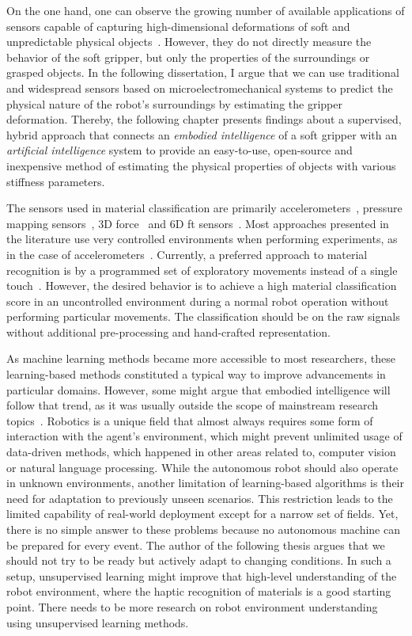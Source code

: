 \documentclass[a4paper, 10pt, twoside]{report}
\begin{document}
On the one hand, one can observe the growing number of available applications of sensors capable of capturing high-dimensional deformations of soft and unpredictable physical objects~\cite{BatchFabricationSensor, TactileTwo, Realmuto}. However, they do not directly measure the behavior of the soft gripper, but only the properties of the surroundings or grasped objects. In the following dissertation, I argue that we can use traditional and widespread sensors based on microelectromechanical systems to predict the physical nature of the robot's surroundings by estimating the gripper deformation. Thereby, the following chapter presents findings about a supervised, hybrid approach that connects an \textit{embodied intelligence} of a soft gripper with an \textit{artificial intelligence} system to provide an easy-to-use, open-source and inexpensive method of estimating the physical properties of objects with various stiffness parameters. 

The sensors used in material classification are primarily accelerometers~\cite{Strese2014AClassification}, pressure mapping sensors~\cite{Tulbure2018}, 3D force~\cite{Kerzel2017} and 6D \acrshort{ft} sensors~\cite{KubaRNN}. Most approaches presented in the literature use very controlled environments when performing experiments, as in the case of accelerometers~\cite{Strese2014AClassification}. Currently, a preferred approach to material recognition is by a programmed set of exploratory movements instead of a single touch~\cite{Kerzel2017, Tulbure2018}. However, the desired behavior is to achieve a high material classification score in an uncontrolled environment during a normal robot operation without performing particular movements. The classification should be on the raw signals without additional pre-processing and hand-crafted representation. 

As machine learning methods became more accessible to most researchers, these learning-based methods constituted a typical way to improve advancements in particular domains. However, some might argue that embodied intelligence will follow that trend, as it was usually outside the scope of mainstream research topics~\cite{Roy2021}. Robotics is a unique field that almost always requires some form of interaction with the agent's environment, which might prevent unlimited usage of data-driven methods, which happened in other areas related to, \eg computer vision or natural language processing. While the autonomous robot should also operate in unknown environments, another limitation of learning-based algorithms is their need for adaptation to previously unseen scenarios. This restriction leads to the limited capability of real-world deployment except for a narrow set of fields. Yet, there is no simple answer to these problems because no autonomous machine can be prepared for every event. The author of the following thesis argues that we should not try to be ready but actively adapt to changing conditions. In such a setup, unsupervised learning might improve that high-level understanding of the robot environment, where the haptic recognition of materials is a good starting point. There needs to be more research on robot environment understanding using unsupervised learning methods. 
\end{document}
